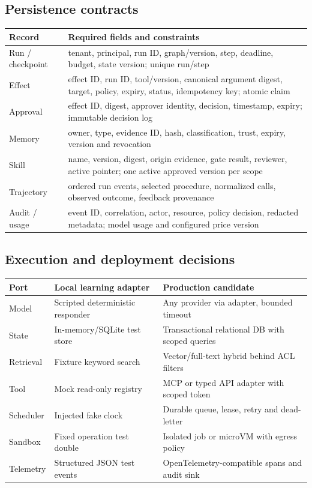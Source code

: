 \documentclass[11pt,letterpaper]{article}
\begin{document}
\subsection{Persistence contracts}
\begin{longtable}{>{\raggedright\arraybackslash}p{.24\linewidth}>{\raggedright\arraybackslash}p{.67\linewidth}}\toprule
Record & Required fields and constraints \\\midrule\endhead
Run / checkpoint & tenant, principal, run ID, graph/version, step, deadline, budget, state version; unique run/step \\
Effect & effect ID, run ID, tool/version, canonical argument digest, target, policy, expiry, status, idempotency key; atomic claim \\
Approval & effect ID, digest, approver identity, decision, timestamp, expiry; immutable decision log \\
Memory & owner, type, evidence ID, hash, classification, trust, expiry, version and revocation \\
Skill & name, version, digest, origin evidence, gate result, reviewer, active pointer; one active approved version per scope \\
Trajectory & ordered run events, selected procedure, normalized calls, observed outcome, feedback provenance \\
Audit / usage & event ID, correlation, actor, resource, policy decision, redacted metadata; model usage and configured price version \\
\bottomrule\end{longtable}
\subsection{Execution and deployment decisions}
\begin{tabularx}{\linewidth}{p{.25\linewidth}YY}\toprule
Port & Local learning adapter & Production candidate \\\midrule
Model & Scripted deterministic responder & Any provider via adapter, bounded timeout \\
State & In-memory/SQLite test store & Transactional relational DB with scoped queries \\
Retrieval & Fixture keyword search & Vector/full-text hybrid behind ACL filters \\
Tool & Mock read-only registry & MCP or typed API adapter with scoped token \\
Scheduler & Injected fake clock & Durable queue, lease, retry and dead-letter \\
Sandbox & Fixed operation test double & Isolated job or microVM with egress policy \\
Telemetry & Structured JSON test events & OpenTelemetry-compatible spans and audit sink \\
\bottomrule\end{tabularx}
\end{document}

